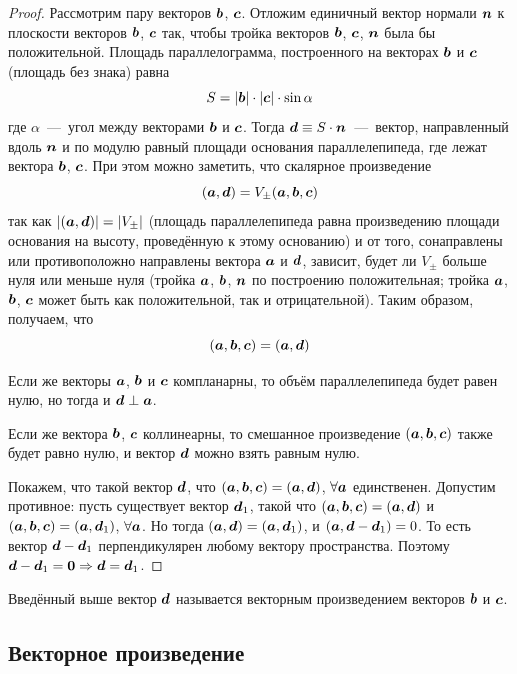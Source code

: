 \documentclass[a4paper,12pt]{article}
\begin{document}
\begin{proof}
    Рассмотрим пару векторов $\boldsymbol b$, $\boldsymbol c$.
    Отложим единичный вектор нормали $\boldsymbol n$ к плоскости векторов $\boldsymbol b$, $\boldsymbol c$ так, чтобы тройка векторов $\boldsymbol b$, $\boldsymbol c$, $\boldsymbol n$ была бы положительной.
    Площадь параллелограмма, построенного на векторах $\boldsymbol b$ и $\boldsymbol c$ (площадь без знака) равна
    \[
      S = |\boldsymbol b| \cdot |\boldsymbol c| \cdot \sin\alpha
    \]
    где $\alpha$~---~угол между векторами $\boldsymbol b$ и $\boldsymbol c$.
    Тогда $\bds d \hm\equiv S \hm\cdot \bds n$~---~вектор, направленный вдоль $\boldsymbol n$ и по модулю равный площади основания параллелепипеда, где лежат вектора $\boldsymbol b$, $\boldsymbol c$.
    При этом можно заметить, что скалярное произведение
    \[
      (\boldsymbol a, \boldsymbol d) = V_{\pm}(\boldsymbol a, \boldsymbol b, \boldsymbol c)
    \]
    так как $|(\bds a, \bds d)| \hm= |V_{\pm}|$ (площадь параллелепипеда равна произведению площади основания на высоту, проведённую к этому основанию) и от того, сонаправлены или противоположно направлены вектора $\boldsymbol a$ и $
    \boldsymbol d$, зависит, будет ли $V_{\pm}$ больше нуля или меньше нуля (тройка $\boldsymbol a$, $\boldsymbol b$, $\boldsymbol n$ по построению положительная; тройка $\boldsymbol a$, $\boldsymbol b$, $\boldsymbol c$ может быть как положительной, так и отрицательной).
    Таким образом, получаем, что
    \[
      (\boldsymbol a, \boldsymbol b, \boldsymbol c) = (\boldsymbol a, \boldsymbol d)
    \]
    
    Если же векторы $\boldsymbol a$, $\boldsymbol b$ и $\boldsymbol c$ компланарны, то объём параллелепипеда будет равен нулю, но тогда и $\bds d \hm\perp \bds a$.
    
    Если же вектора $\boldsymbol b$, $\boldsymbol c$ коллинеарны, то смешанное произведение $(\boldsymbol a, \boldsymbol b, \boldsymbol c)$ также будет равно нулю, и вектор $\boldsymbol d$ можно взять равным нулю.
    
    Покажем, что такой вектор $\boldsymbol d$, что $(\bds a, \bds b, \bds c) \hm= (\bds a, \bds d)$, $\forall \boldsymbol a$ единственен.
    Допустим противное: пусть существует вектор $\boldsymbol d_1$, такой что $(\bds a, \bds b, \bds c) \hm= (\bds a, \bds d)$ и $(\bds a, \bds b, \bds c) \hm= (\bds a, \bds d_1)$, $\forall \boldsymbol a$.
    Но тогда $(\bds a, \bds d) \hm= (\bds a, \bds d_1)$, и $(\bds a, \bds d \hm- \bds d_1) \hm= 0$.
    То есть вектор $\bds d \hm- \bds d_1$ перпендикулярен любому вектору пространства.
    Поэтому $\bds d \hm- \bds d_1 \hm= \bds 0 \hm\Rightarrow \bds d \hm= \bds d_1$.
  \end{proof}
  
  Введённый выше вектор $\boldsymbol d$ называется векторным произведением векторов $\boldsymbol b$ и $\boldsymbol c$.
  
  \subsection{Векторное произведение}
  
\end{document}

